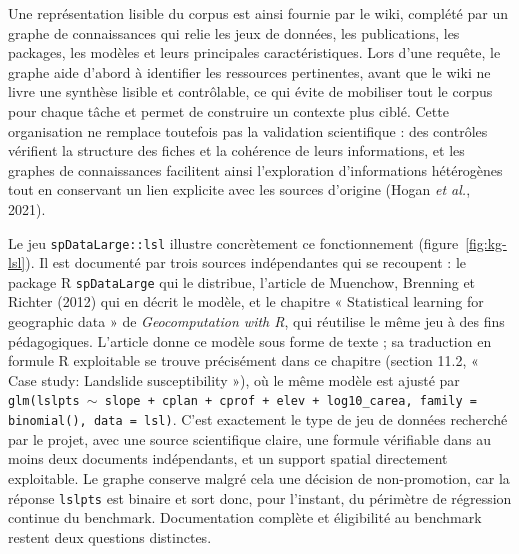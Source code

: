 \documentclass[11pt,a4paper]{article}
\begin{document}
Une représentation lisible du corpus est ainsi fournie par le wiki, complété par un graphe de connaissances qui relie les jeux de données, les publications, les packages, les modèles et leurs principales caractéristiques. Lors d'une requête, le graphe aide d'abord à identifier les ressources pertinentes, avant que le wiki ne livre une synthèse lisible et contrôlable, ce qui évite de mobiliser tout le corpus pour chaque tâche et permet de construire un contexte plus ciblé. Cette organisation ne remplace toutefois pas la validation scientifique : des contrôles vérifient la structure des fiches et la cohérence de leurs informations, et les graphes de connaissances facilitent ainsi l'exploration d'informations hétérogènes tout en conservant un lien explicite avec les sources d'origine (Hogan \textit{et al.}, 2021).

Le jeu \texttt{spDataLarge::lsl} illustre concrètement ce fonctionnement (figure~\ref{fig:kg-lsl}). Il est documenté par trois sources indépendantes qui se recoupent : le package R \texttt{spDataLarge} qui le distribue, l'article de Muenchow, Brenning et Richter (2012) qui en décrit le modèle, et le chapitre « Statistical learning for geographic data » de \textit{Geocomputation with R}, qui réutilise le même jeu à des fins pédagogiques. L'article donne ce modèle sous forme de texte ; sa traduction en formule R exploitable se trouve précisément dans ce chapitre (section 11.2, « Case study: Landslide susceptibility »), où le même modèle est ajusté par \texttt{glm(lslpts $\sim$ slope + cplan + cprof + elev + log10\_carea, family = binomial(), data = lsl)}. C'est exactement le type de jeu de données recherché par le projet, avec une source scientifique claire, une formule vérifiable dans au moins deux documents indépendants, et un support spatial directement exploitable. Le graphe conserve malgré cela une décision de non-promotion, car la réponse \texttt{lslpts} est binaire et sort donc, pour l'instant, du périmètre de régression continue du benchmark. Documentation complète et éligibilité au benchmark restent deux questions distinctes.
\end{document}

